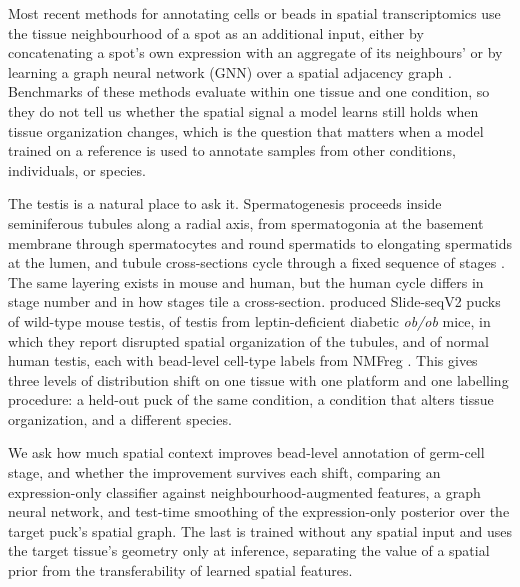 Most recent methods for annotating cells or beads in spatial transcriptomics use the tissue neighbourhood of a spot as an additional input, either by concatenating a spot's own expression with an aggregate of its neighbours' \citep{singhal2024banksy, varrone2024cellcharter} or by learning a graph neural network (GNN) over a spatial adjacency graph \citep{hu2021spagcn, dong2022deciphering, long2023spatially}. Benchmarks of these methods \citep{yuan2024benchmarking, li2022benchmarking} evaluate within one tissue and one condition, so they do not tell us whether the spatial signal a model learns still holds when tissue organization changes, which is the question that matters when a model trained on a reference is used to annotate samples from other conditions, individuals, or species.

The testis is a natural place to ask it. Spermatogenesis proceeds inside seminiferous tubules along a radial axis, from spermatogonia at the basement membrane through spermatocytes and round spermatids to elongating spermatids at the lumen, and tubule cross-sections cycle through a fixed sequence of stages \citep{hess2008spermatogenesis, chakravorty2026temporal}. The same layering exists in mouse and human, but the human cycle differs in stage number and in how stages tile a cross-section. \citet{chen2021dissecting} produced Slide-seqV2 \citep{stickels2021highly} pucks of wild-type mouse testis, of testis from leptin-deficient diabetic \emph{ob/ob} mice, in which they report disrupted spatial organization of the tubules, and of normal human testis, each with bead-level cell-type labels from NMFreg \citep{rodriques2019slide}. This gives three levels of distribution shift on one tissue with one platform and one labelling procedure: a held-out puck of the same condition, a condition that alters tissue organization, and a different species.

We ask how much spatial context improves bead-level annotation of germ-cell stage, and whether the improvement survives each shift, comparing an expression-only classifier against neighbourhood-augmented features, a graph neural network, and test-time smoothing of the expression-only posterior over the target puck's spatial graph. The last is trained without any spatial input and uses the target tissue's geometry only at inference, separating the value of a spatial prior from the transferability of learned spatial features.
